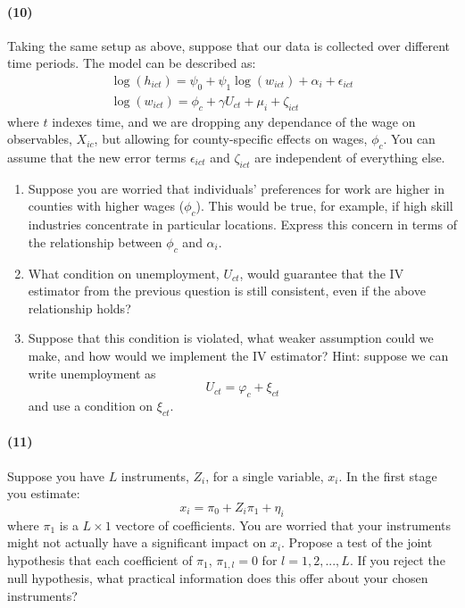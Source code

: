 \documentclass[12pt]{article}
\newcommand\eps{\epsilon}
\numberwithin{equation}{section}
\numberwithin{figure}{section}
\numberwithin{table}{section}
\begin{document}
\paragraph{(10)} Taking the same setup as above, suppose that our data is collected over different time periods. The model can be described as:
\begin{eqnarray}
\log(h_{ict}) = \psi_0 + \psi_1\log(w_{ict}) + \alpha_i + \eps_{ict}  \nonumber\\
\log(w_{ict}) = \phi_c + \gamma U_{ct} + \mu_i + \zeta_{ict} \nonumber
\end{eqnarray}
where $t$ indexes time, and we are dropping any dependance of the wage on observables, $X_{ic}$, but allowing for county-specific effects on wages, $\phi_c$. You can assume that the new error terms $\eps_{ict}$ and $\zeta_{ict}$ are independent of everything else. 
\begin{enumerate}
\item Suppose you are worried that individuals' preferences for work are higher in counties with higher wages ($\phi_c$). This would be true, for example, if high skill industries concentrate in particular locations. Express this concern in terms of the relationship between $\phi_c$ and $\alpha_i$.
\item What condition on unemployment, $U_{ct}$, would guarantee that the IV estimator from the previous question is still consistent, even if the above relationship holds?
\item Suppose that this condition is violated, what weaker assumption could we make, and how would we implement the IV estimator? Hint: suppose we can write unemployment as
  \[U_{ct} = \varphi_c + \xi_{ct} \]
  and use a condition on $\xi_{ct}$.
\end{enumerate}


\paragraph{(11)} Suppose you have $L$ instruments, $Z_i$, for a single variable, $x_i$. In the first stage you estimate:
\[ x_i = \pi_0 + Z_i\pi_1 + \eta_i \]
where $\pi_1$ is a $L\times 1$ vectore of coefficients. You are worried that your instruments might not actually have a significant impact on $x_i$. Propose a test of the joint hypothesis that each coefficient of $\pi_1$, $\pi_{1,l}=0$ for $l=1,2,...,L$. If you reject the null hypothesis, what practical information does this offer about your chosen instruments?
\end{document}
